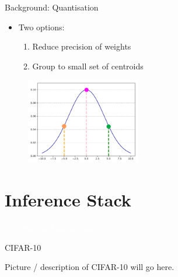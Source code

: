 \documentclass[xcolor=dvipsnames]{beamer}
\begin{document}
\begin{frame}{Background: Quantisation}
\begin{itemize}
    \item Two options:
    \begin{enumerate}
        \item Reduce precision of weights
        \item Group to small set of centroids
    \end{enumerate}
\end{itemize}

\begin{figure}
    \centering
    \includegraphics[width=5cm]{images/quantization.pdf}
\end{figure}


\end{frame}

\section{Inference Stack}

{
\begin{frame}
    \centering
    \textcolor{white}{\LARGE Experimental methodology}
\end{frame}
}



\begin{frame}{CIFAR-10}

Picture / description of CIFAR-10 will go here.

\end{frame}
\end{document}
